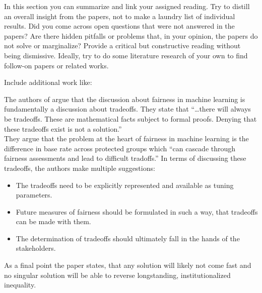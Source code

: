 In this section you can summarize and link your assigned reading. Try to distill an overall insight 
from the papers, not to make a laundry list of individual results. Did you come across open questions 
that were not answered in the papers? Are there hidden pitfalls or problems that, in your opinion, the 
papers do not solve or marginalize? Provide a critical but constructive reading without being dismissive. 
Ideally, try to do some literature research of your own to find follow-on papers or related works. 

Include additional work like: \cite{automatedDsicrimination} \cite{Singh} \cite{DBLP:conf/maics/RalescuR17}

The authors of \cite{Berk.2018} argue that the discussion about fairness in machine learning 
is fundamentally a discussion about tradeoffs. They state that \enquote{\dots there will 
always be tradeoffs. These are mathematical facts subject to formal proofs. Denying that these
tradeoffs exist is not a solution.} \\
They argue that the problem at the heart of fairness in machine learning is the difference
in base rate across protected groups which \enquote{can cascade through fairness assessments
and lead to difficult tradoffs.} In terms of discussing these tradeoffs, the authors make multiple
suggestions:
\begin{itemize}
    \item The tradeoffs need to be explicitly represented and available as tuning parameters.
    \item Future measures of fairness should be formulated in such a way, that tradeoffs can
    be made with them.
    \item The determination of tradeoffs should ultimately fall in the hands of the stakeholders.
\end{itemize}
As a final point the paper states, that any solution will likely not come fast and no singular
solution will be able to reverse longstanding, institutionalized inequality.